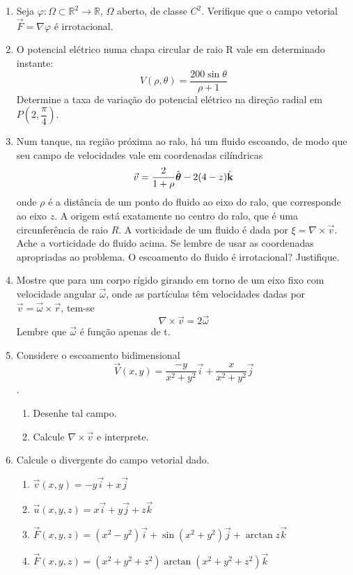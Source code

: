 \documentclass[11pt,a4paper]{article}
\newcommand{\mat}[1]{\mbox{\boldmath{$#1$}}}
\begin{document}
\begin{enumerate}
			\item Seja $\varphi : \Omega \subset \mathbb{R}^2 \to \mathbb{R}$, $\Omega$ aberto, de classe $C^2$. Verifique que o campo vetorial $\overrightarrow{F} = \nabla \varphi $ é irrotacional.
			
			\item O potencial elétrico numa chapa circular de raio R vale em determinado instante:
	$$V(\rho,\theta) = \displaystyle\dfrac{200 \sin \theta}{\rho + 1}$$
	Determine a taxa de variação do potencial elétrico na direção radial em $P\left(2,\displaystyle\dfrac{\pi}{4}\right)$.
	
	\item Num tanque, na região próxima ao ralo, há um fluido escoando, de modo que seu campo de velocidades vale em coordenadas cilíndricas
	$$\vec{v} = \displaystyle\dfrac{2}{1+\rho} \hat{\mat{\theta}} - 2(4 - z)\hat{\textbf{k}}$$
	onde $\rho$ é a distância de um ponto do fluido ao eixo do ralo, que corresponde ao eixo $z$. A origem está exatamente no centro do ralo, que é uma circunferência de raio $R$.
	A vorticidade de um fluido é dada por $\xi = \nabla \times \vec{v}$. Ache a vorticidade do fluido acima. Se lembre de usar as coordenadas apropriadas ao problema. O escoamento do fluido é irrotacional? Justifique.
	
	\item Mostre que para um corpo rígido girando em torno de um eixo fixo com velocidade angular $\vec{\omega}$, onde as partículas têm velocidades dadas por $\vec{v} = \vec{\omega} \times \vec{r}$, tem-se
	$$\nabla \times \vec{v} = 2\vec{\omega}$$
	Lembre que $\vec{\omega}$ é função apenas de t.
	
	\item Considere o escoamento bidimensional
	$$\overrightarrow{V}(x,y) = \displaystyle\dfrac{-y}{x^2 + y^2} \vec{i} + \displaystyle\dfrac{x}{x^2 + y^2}\vec{j}$$.
	\begin{enumerate}
	\item Desenhe tal campo.
	\item Calcule $\nabla \times \vec{v}$ e interprete.
	\end{enumerate}
	
	\item Calcule o divergente do campo vetorial dado.
	\begin{enumerate}
	\item $\vec{v}(x,y) = -y\vec{i} + x\vec{j}$
	\item $\vec{u}(x,y,z) = x\vec{i} + y\vec{j} + z\vec{k}$
	\item $\overrightarrow{F}(x,y,z) = (x^2 - y^2)\vec{i} + \sin (x^2 + y^2)\vec{j} + \arctan z \vec{k}$
	\item $\overrightarrow{F}(x,y,z) = (x^2 + y^2 + z^2)\arctan (x^2 + y^2 + z^2) \vec{k}$
	

\end{enumerate}
\end{enumerate}
\end{document}
